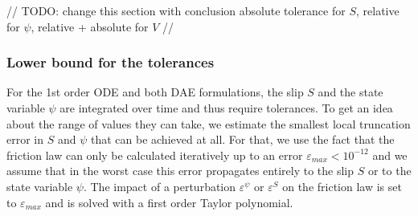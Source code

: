 // TODO: change this section with conclusion absolute tolerance for $S$, relative for $\psi$, relative + absolute for $V$  //

\subsubsection{Lower bound for the tolerances}
For the 1st order ODE and both DAE formulations, the slip $S$ and the state variable $\psi$ are integrated over time and thus require tolerances. To get an idea about the range of values they can take, we estimate the smallest local truncation error in  $S$ and $\psi$ that can be achieved at all. For that, we use the fact that the friction law can only be calculated iteratively up to an error $\varepsilon_{max} < 10^{-12}$ and we assume that in the worst case this error propagates entirely to the slip $S$ or to the state variable $\psi$. The impact of a perturbation $\varepsilon^{\psi}$ or $\varepsilon^{S}$ on the friction law is set to $\varepsilon_{max}$ and is solved with a first order Taylor polynomial.

